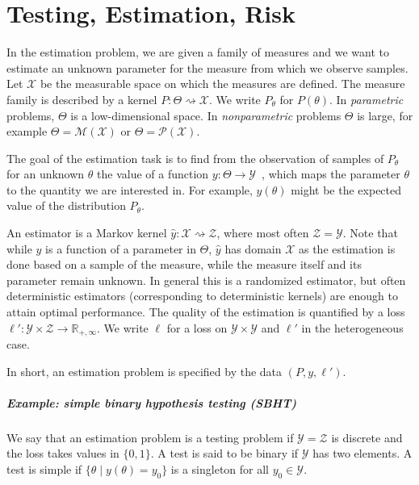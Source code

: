 \chapter{Testing, Estimation, Risk}

In the estimation problem, we are given a family of measures and we want to estimate an unknown parameter for the measure from which we observe samples.
Let $\mathcal X$ be the measurable space on which the measures are defined.
The measure family is described by a kernel $P : \Theta \rightsquigarrow \mathcal X$. We write $P_\theta$ for $P(\theta)$.
In \emph{parametric} problems, $\Theta$ is a low-dimensional space. In \emph{nonparametric} problems $\Theta$ is large, for example $\Theta = \mathcal M (\mathcal X)$ or $\Theta = \mathcal P(\mathcal X)$.

The goal of the estimation task is to find from the observation of samples of $P_\theta$ for an unknown $\theta$ the value of a function $y : \Theta \to \mathcal Y$~, which maps the parameter $\theta$ to the quantity we are interested in. For example, $y(\theta)$ might be the expected value of the distribution $P_\theta$.

An estimator is a Markov kernel $\hat{y} : \mathcal X \rightsquigarrow \mathcal Z$, where most often $\mathcal Z = \mathcal Y$.
Note that while $y$ is a function of a parameter in $\Theta$, $\hat{y}$ has domain $\mathcal X$ as the estimation is done based on a sample of the measure, while the measure itself and its parameter remain unknown.
In general this is a randomized estimator, but often deterministic estimators (corresponding to deterministic kernels) are enough to attain optimal performance.
The quality of the estimation is quantified by a loss $\ell' : \mathcal Y \times \mathcal Z \to \mathbb{R}_{+, \infty}$. We write $\ell$ for a loss on $\mathcal Y \times \mathcal Y$ and $\ell'$ in the heterogeneous case.

In short, an estimation problem is specified by the data $(P, y, \ell')$.

\paragraph{Example: simple binary hypothesis testing (SBHT)}

We say that an estimation problem is a testing problem if $\mathcal Y = \mathcal Z$ is discrete and the loss takes values in $\{0, 1\}$.
A test is said to be binary if $\mathcal Y$ has two elements.
A test is simple if $\{\theta \mid y(\theta) = y_0\}$ is a singleton for all $y_0 \in \mathcal Y$.

